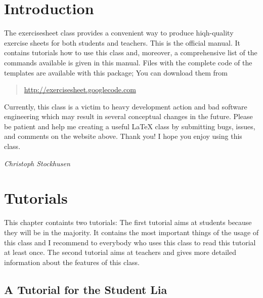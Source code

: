 \documentclass[a4paper,fleqn]{report}
\let\sffamily=\rmfamily
\def\exercisesheet{{exercisesheet}}
\begin{document}



\chapter*{Introduction}

The \exercisesheet{} class provides a convenient way to produce
hiqh-quality exercise sheets for both students and teachers.  This is
the official manual. It contains tutorials how to use this class and,
moreover, a comprehensive list of the commands available is given in
this manual. Files with the complete code of the templates are
available with this package; You can download them from 
\begin{quote}
  \url{http://exercisesheet.googlecode.com} 
\end{quote}
Currently, this class is a victim to heavy development action and bad
software engineering which may result in several conceptual changes in
the future. Please be patient and help me creating a useful \LaTeX{}
class by submitting bugs, issues, and comments on the website above.
Thank you! I hope you enjoy using this class.

\medskip\hfill{\itshape Christoph Stockhusen}

\tableofcontents

\chapter{Tutorials}

This chapter containts two tutorials: The first tutorial aims at
students because they will be in the majority. It contains the most
important things of the usage of this class and I recommend to
everybody who uses this class to read this tutorial at least once. The
second tutorial aims at teachers and gives more detailed information
about the features of this class.


\section{A Tutorial for the Student Lia}
\end{document}
